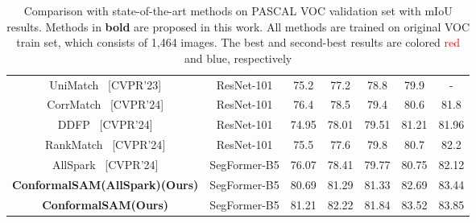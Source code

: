 \begin{table}[]
\begin{tabular}{c|c|ccccc}
UniMatch \cite{yang2023revisiting}\ \textcolor[HTML]{9B9B9B}{\scriptsize[{CVPR'23}]} &ResNet-101    & 75.2                & 77.2                    & 78.8             & 79.9              & -                       \\
CorrMatch \cite{sun2024corrmatch}\ \textcolor[HTML]{9B9B9B}{\scriptsize[{CVPR'24}]} &ResNet-101     & 76.4                  & 78.5                  & 79.4                    & 80.6                    & 81.8                  \\
DDFP \cite{wang2024towards}\ \textcolor[HTML]{9B9B9B}{\scriptsize[{CVPR'24}]} &ResNet-101     & 74.95                & 78.01             & 79.51              & 81.21             & 81.96                \\
RankMatch \cite{mai2024rankmatch}\ \textcolor[HTML]{9B9B9B}{\scriptsize[{CVPR'24}]} &ResNet-101     & 75.5                  & 77.6                & 79.8                & 80.7                      & 82.2                    \\
AllSpark \cite{wang2024allspark}\ \textcolor[HTML]{9B9B9B}{\scriptsize[{CVPR'24}]} & SegFormer-B5     & 76.07                 & 78.41                 & 79.77                & 80.75              & 82.12              \\ \hline
\textbf{ConformalSAM(AllSpark)(Ours)}      & SegFormer-B5      & {\color[HTML]{00B0F0} 80.69} & {\color[HTML]{00B0F0} 81.29} & {\color[HTML]{00B0F0} 81.33} & {\color[HTML]{00B0F0} 82.69} & {\color[HTML]{00B0F0} 83.44} \\
\textbf{ConformalSAM(Ours)}               & SegFormer-B5      & {\color[HTML]{FE0000} 81.21} & {\color[HTML]{FE0000} 82.22} & {\color[HTML]{FE0000} 81.84} & {\color[HTML]{FE0000} 83.52} & {\color[HTML]{FE0000} 83.85} \\ \hline
\end{tabular}
\vspace{-0.3cm}
\caption{Comparison with state-of-the-art methods on PASCAL VOC validation set with mIoU results. Methods in \textbf{bold} are proposed in this work. All methods are trained on original VOC train set, which consists of 1,464 images. The best and second-best results are colored \textcolor{red}{red} and {\color[HTML]{00B0F0} blue}, respectively}
\label{table1}
\end{table}
